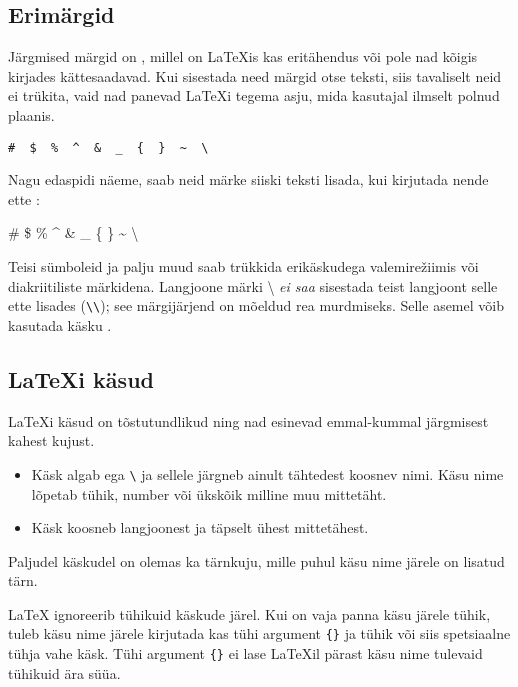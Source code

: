\subsection{Erimärgid}

Järgmised märgid on , millel on \LaTeX is kas
eritähendus või pole nad kõigis kirjades kättesaadavad. Kui sisestada
need märgid otse teksti, siis tavaliselt neid ei trükita, vaid nad
panevad \LaTeX i tegema asju, mida kasutajal ilmselt polnud plaanis.
\begin{code}
\verb.#  $  %  ^  &  _  {  }  ~  \ . %
\end{code}
Nagu edaspidi näeme, saab neid märke siiski teksti lisada, kui kirjutada
nende ette :
\begin{example}
\# \$ \% \^{} \& \_ \{ \} \~{}
\textbackslash
\end{example}

Teisi sümboleid ja palju muud saab trükkida erikäskudega
valemire\v{z}iimis või diakriitiliste märkidena.
Langjoone märki \textbackslash{} \emph{ei saa} sisestada
teist langjoont selle ette lisades (\verb|\\|); see märgijärjend on
mõeldud rea murdmiseks. Selle asemel võib kasutada käsku
.

\subsection{\LaTeX i käsud}

\LaTeX i käsud on tõstutundlikud ning nad esinevad
emmal-kummal järgmisest kahest kujust.

\begin{itemize}
\item Käsk algab ega \verb|\| ja sellele järgneb ainult
tähtedest koosnev nimi. Käsu nime lõpetab tühik, number või ükskõik
milline muu mittetäht.
\item Käsk koosneb langjoonest ja täpselt ühest mittetähest.
\end{itemize}

Paljudel käskudel on olemas ka tärnkuju, mille puhul käsu nime järele on
lisatud tärn.

%
%

%
%
\label{whitespace}

\LaTeX{} ignoreerib tühikuid käskude järel. Kui on vaja panna käsu
järele tühik, tuleb käsu nime järele kirjutada
kas tühi argument \verb|{}| ja tühik või siis spetsiaalne tühja vahe
käsk. Tühi argument \verb|{}| ei lase \LaTeX il pärast käsu nime
tulevaid tühikuid ära süüa.

